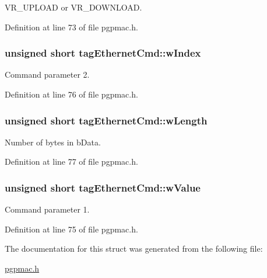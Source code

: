 V\-R\-\_\-\-U\-P\-L\-O\-A\-D or V\-R\-\_\-\-D\-O\-W\-N\-L\-O\-A\-D. 



Definition at line 73 of file pgpmac.\-h.

\hypertarget{structtagEthernetCmd_a92f5a374e87d4f496b64b4888850d6e6}{
\subsubsection[{w\-Index}]{\setlength{\rightskip}{0pt plus 5cm}unsigned short tag\-Ethernet\-Cmd\-::w\-Index}}\label{structtagEthernetCmd_a92f5a374e87d4f496b64b4888850d6e6}


Command parameter 2. 



Definition at line 76 of file pgpmac.\-h.

\hypertarget{structtagEthernetCmd_af5df25ff13ca30fa33719d0df1ab7e97}{
\subsubsection[{w\-Length}]{\setlength{\rightskip}{0pt plus 5cm}unsigned short tag\-Ethernet\-Cmd\-::w\-Length}}\label{structtagEthernetCmd_af5df25ff13ca30fa33719d0df1ab7e97}


Number of bytes in b\-Data. 



Definition at line 77 of file pgpmac.\-h.

\hypertarget{structtagEthernetCmd_aec0ee9a5f6c7e3bc6e4bd98f1bd52783}{
\subsubsection[{w\-Value}]{\setlength{\rightskip}{0pt plus 5cm}unsigned short tag\-Ethernet\-Cmd\-::w\-Value}}\label{structtagEthernetCmd_aec0ee9a5f6c7e3bc6e4bd98f1bd52783}


Command parameter 1. 



Definition at line 75 of file pgpmac.\-h.



The documentation for this struct was generated from the following file\-:\begin{DoxyCompactItemize}
\item 
\hyperlink{pgpmac_8h}{pgpmac.\-h}\end{DoxyCompactItemize}

